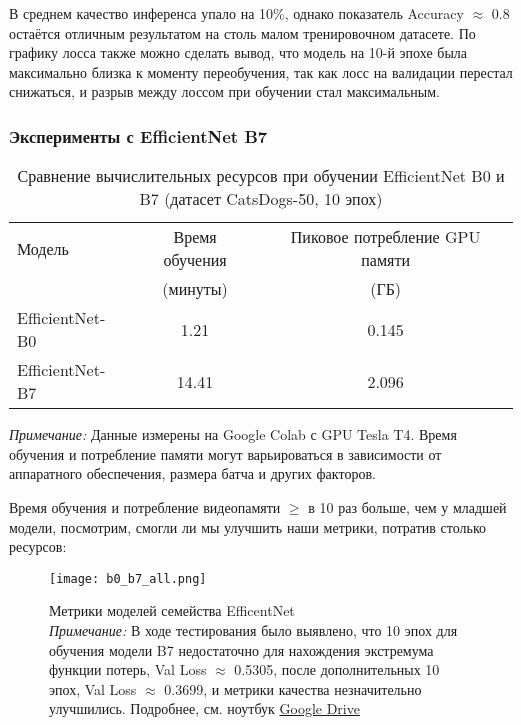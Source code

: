 \documentclass[14pt]{extarticle}
\begin{document}
В среднем качество инференса упало на 10\%, однако показатель Accuracy $\approx$ 0.8 остаётся отличным результатом на столь малом тренировочном датасете. По графику лосса также можно сделать вывод, что модель на 10-й эпохе была максимально близка к моменту переобучения, так как лосс на валидации перестал снижаться, и разрыв между лоссом при обучении стал максимальным.

\subsubsection{Эксперименты с EfficientNet B7}
\begin{table}[htbp] 
  \centering
  \caption{Сравнение вычислительных ресурсов при обучении EfficientNet B0 и B7 (датасет CatsDogs-50, 10 эпох)}
  \label{tab:resource_comparison_efficientnet}
  \begin{tabular}{l c c}
    \toprule
    Модель & Время обучения & Пиковое потребление GPU памяти \\
           & (минуты)        & (ГБ) \\
    \midrule
    EfficientNet-B0 & 1.21  & 0.145 \\
    EfficientNet-B7 & 14.41 & 2.096 \\
    \bottomrule
  \end{tabular}
  \par\medskip 
  \footnotesize{ 
    \textit{Примечание:} Данные измерены на Google Colab с GPU Tesla T4. Время обучения и потребление памяти могут варьироваться в зависимости от аппаратного обеспечения, размера батча и других факторов.
  }
\end{table}

Время обучения и потребление видеопамяти $\ge$ в 10 раз больше, чем у младшей модели, посмотрим, смогли ли мы улучшить наши метрики, потратив столько ресурсов:
\begin{figure}[H]
    \centering
    \texttt{[image: b0\_b7\_all.png]}
    \caption{
    \centering
    Метрики моделей семейства EfficentNet\\ 
    \textit{Примечание:} В ходе тестирования было выявлено, что 10 эпох для обучения модели B7 недостаточно для нахождения экстремума функции потерь, Val Loss $\approx$ 0.5305, после дополнительных 10 эпох, Val Loss $\approx$ 0.3699, и метрики качества незначительно улучшились. Подробнее, см. ноутбук \href{https://drive.google.com/drive/folders/15sB_uKL3jGbAPhytC0EaE44mOfEbUL0C?usp=sharing}{Google Drive}}
    \label{fig:имя_метки}
\end{figure}
\end{document}
